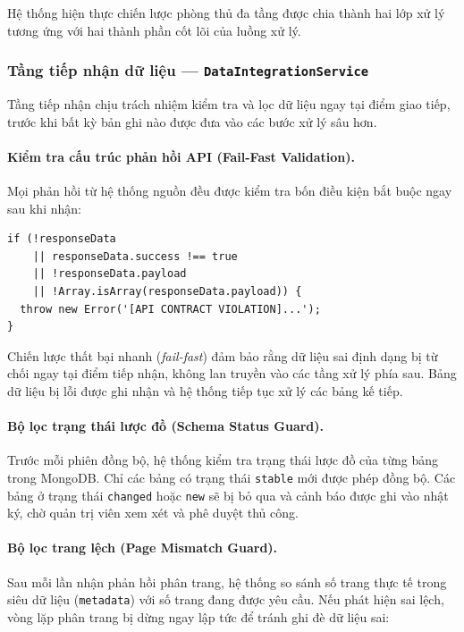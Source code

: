 Hệ thống hiện thực chiến lược phòng thủ đa tầng được chia thành hai lớp xử lý tương ứng với hai thành phần cốt lõi của luồng xử lý.

\subsubsection{Tầng tiếp nhận dữ liệu --- \texttt{DataIntegrationService}}

Tầng tiếp nhận chịu trách nhiệm kiểm tra và lọc dữ liệu ngay tại điểm giao tiếp, trước khi bất kỳ bản ghi nào được đưa vào các bước xử lý sâu hơn.

\paragraph{Kiểm tra cấu trúc phản hồi API (Fail-Fast Validation).}
Mọi phản hồi từ hệ thống nguồn đều được kiểm tra bốn điều kiện bắt buộc ngay sau khi nhận:

\begin{verbatim}
if (!responseData
    || responseData.success !== true
    || !responseData.payload
    || !Array.isArray(responseData.payload)) {
  throw new Error('[API CONTRACT VIOLATION]...');
}
\end{verbatim}

Chiến lược thất bại nhanh (\textit{fail-fast}) đảm bảo rằng dữ liệu sai định dạng bị từ chối ngay tại điểm tiếp nhận, không lan truyền vào các tầng xử lý phía sau. Bảng dữ liệu bị lỗi được ghi nhận và hệ thống tiếp tục xử lý các bảng kế tiếp.

\paragraph{Bộ lọc trạng thái lược đồ (Schema Status Guard).}
Trước mỗi phiên đồng bộ, hệ thống kiểm tra trạng thái lược đồ của từng bảng trong MongoDB. Chỉ các bảng có trạng thái \texttt{stable} mới được phép đồng bộ. Các bảng ở trạng thái \texttt{changed} hoặc \texttt{new} sẽ bị bỏ qua và cảnh báo được ghi vào nhật ký, chờ quản trị viên xem xét và phê duyệt thủ công.

\paragraph{Bộ lọc trang lệch (Page Mismatch Guard).}
Sau mỗi lần nhận phản hồi phân trang, hệ thống so sánh số trang thực tế trong siêu dữ liệu (\texttt{metadata}) với số trang đang được yêu cầu. Nếu phát hiện sai lệch, vòng lặp phân trang bị dừng ngay lập tức để tránh ghi đè dữ liệu sai:

